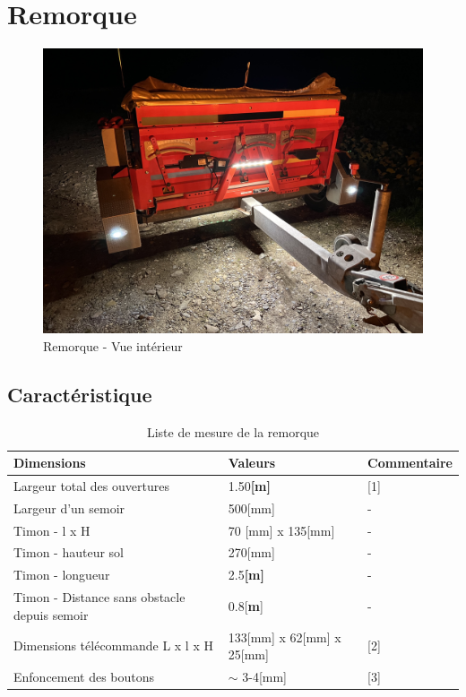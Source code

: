 \section{Remorque}
\begin{figure}[H]
    \centering
    \includegraphics[width=12cm]{assets/figures/remorque.jpeg}
    \caption{Remorque - Vue intérieur}
\end{figure}
\subsection{Caractéristique}
\begin{table}[H]
    \begin{center}
        \caption{Liste de mesure de la remorque}
        \begin{tabular}{|l|l|l|}
            Dimensions                                   & Valeurs                   & Commentaire \\ \hline
            Largeur total des ouvertures                 & 1.50\textbf{[m]}          & [1]         \\
            Largeur d'un semoir                          & 500[mm]                   & -           \\
            Timon - l x H                                & 70 [mm] x 135[mm]         & -           \\
            Timon - hauteur sol                          & 270[mm]                   & -           \\
            Timon - longueur                             & 2.5\textbf{[m]}           & -           \\
            Timon - Distance sans obstacle depuis semoir & 0.8[\textbf{m}]           & -           \\
            Dimensions télécommande L x l x H            & 133[mm] x 62[mm] x 25[mm] & [2]         \\
            Enfoncement des boutons                      & $\sim$ 3-4[mm]            & [3]         \\
        \end{tabular}
    \end{center}
\end{table}

